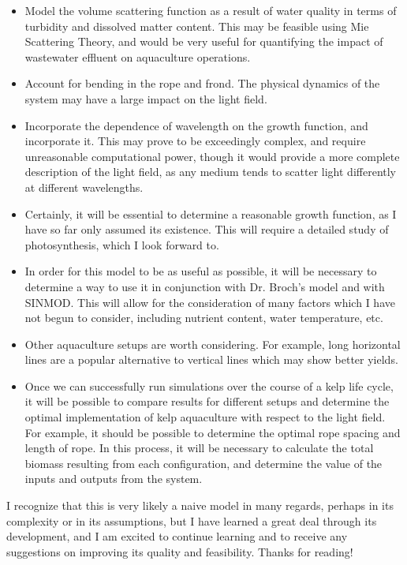 \documentclass[10pt]{article}
\begin{document}
\begin{multicols}{2}
\begin{itemize}
	\item Model the volume scattering function as a result of water quality in terms of turbidity and dissolved matter content.
		This may be feasible using Mie Scattering Theory, and would be very useful for quantifying the impact of wastewater effluent on aquaculture operations.
	\item Account for bending in the rope and frond.
		The physical dynamics of the system may have a large impact on the light field.
	\item Incorporate the dependence of wavelength on the growth function, and incorporate it.
		This may prove to be exceedingly complex, and require unreasonable computational power, though it would provide a more complete description of the light field, as any medium tends to scatter light differently at different wavelengths.
	\item Certainly, it will be essential to determine a reasonable growth function, as I have so far only assumed its existence.
		This will require a detailed study of photosynthesis, which I look forward to.
	\item In order for this model to be as useful as possible, it will be necessary to determine a way to use it in conjunction with Dr. Broch's model and with SINMOD.
		This will allow for the consideration of many factors which I have not begun to consider, including nutrient content, water temperature, etc.
	\item Other aquaculture setups are worth considering.
		For example, long horizontal lines are a popular alternative to vertical lines which may show better yields.
	\item Once we can successfully run simulations over the course of a kelp life cycle, it will be possible to compare results for different setups and determine the optimal implementation of kelp aquaculture with respect to the light field.
		For example, it should be possible to determine the optimal rope spacing and length of rope.
		In this process, it will be necessary to calculate the total biomass resulting from each configuration, and determine the value of the inputs and outputs from the system.
\end{itemize}

I recognize that this is very likely a naive model in many regards, perhaps in its complexity or in its assumptions, but I have learned a great deal through its development, and I am excited to continue learning and to receive any suggestions on improving its quality and feasibility.
Thanks for reading!
\end{multicols}
\end{document}
